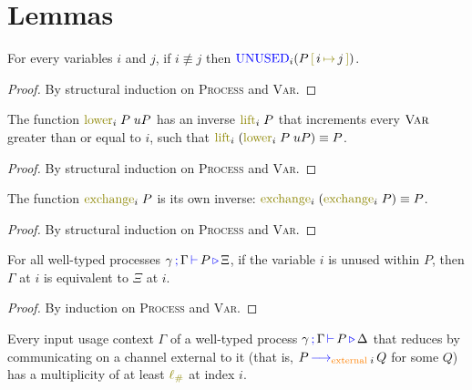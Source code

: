 \section{Lemmas}
\label{app:lemmas}

\begin{nilemma}
  \label{lm:renaming-unused}
  For every variables $i$ and $j$, if $i \not\equiv j$ then $\Unused_i (\subst{P}{j}{i})$.
\end{nilemma}
\begin{proof}
  By structural induction on \textsc{Process} and \textsc{Var}.
\end{proof}

\begin{nilemma}
  \label{lm:lower-lift}
  The function $\func{lower}_i \; P \; uP$ has an inverse $\func{lift}_i \; P$ that increments every $\textsc{Var}$ greater than or equal to $i$, such that $\func{lift}_i \; (\func{lower}_i \; P \; uP) \equiv P$.
\end{nilemma}
\begin{proof}
  By structural induction on \textsc{Process} and \textsc{Var}.
\end{proof}

\begin{nilemma}
  \label{lm:exchange-exchange}
  The function $\func{exchange}_i \; P$ is its own inverse: $\func{exchange}_i \; (\func{exchange}_i \; P) \equiv P$.
\end{nilemma}
\begin{proof}
  By structural induction on \textsc{Process} and \textsc{Var}.
\end{proof}

\begin{nilemma}
  \label{lm:types-unused}
  For all well-typed processes $\gamma \, \textcolor{blue}{\operatorname{;}} \, \Gamma \, \textcolor{blue}{\operatorname{\vdash}} \, P \, \textcolor{blue}{\operatorname{\triangleright}} \, \Xi$, if the variable $i$ is unused within $P$, then $\Gamma$ at $i$ is equivalent to $\Xi$ at $i$.
\end{nilemma}
\begin{proof}
  By induction on \textsc{Process} and \textsc{Var}.
\end{proof}

\begin{nilemma}
  \label{lm:comm-capable}
  Every input usage context $\Gamma$ of a well-typed process $\gamma \, \textcolor{blue}{\operatorname{;}} \, \Gamma \, \textcolor{blue}{\operatorname{\vdash}} \, P \, \textcolor{blue}{\operatorname{\triangleright}} \, \Delta$ that reduces by communicating on a channel external to it (that is, $P \, \textcolor{blue}{\operatorname{\longrightarrow}}_{\textcolor{orange}{\operatorname{external}} \; i} \, Q$ for some $Q$) has a multiplicity of at least $\lio$ at index $i$.
\end{nilemma}

